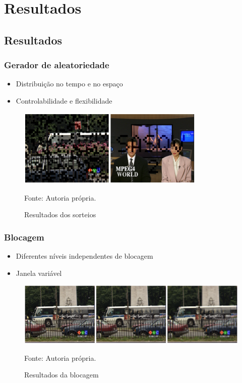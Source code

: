 \section{Resultados}

\subsection{Resultados}
	\begin{frame}\frametitle{Gerador de aleatoriedade}
		\begin{itemize}
			\item Distribuição no tempo e no espaço
			\item Controlabilidade e flexibilidade
		\end{itemize}

		\begin{figure}
			\includegraphics[width=0.8\textwidth]{./imgs/raffle.png}
			\caption{Resultados dos sorteios}
			\tiny
			Fonte: Autoria própria.
		\end{figure}
    \end{frame}

    \begin{frame}\frametitle{Blocagem}
		\begin{itemize}
			\item Diferentes níveis independentes de blocagem
			\item Janela variável
		\end{itemize}

		\begin{figure}
			\includegraphics[width=1\textwidth]{./imgs/block.png}
			\caption{Resultados da blocagem}
			\tiny
			Fonte: Autoria própria.
		\end{figure}

    \end{frame}
	
